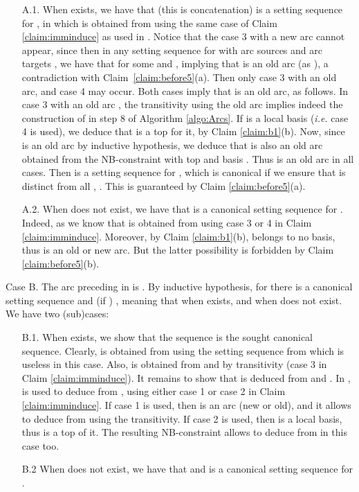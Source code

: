 \documentclass{article}
\begin{document}
\begin{enumerate} 
\item[A.1.]  When  exists, we have that  
(this is concatenation)
is a setting sequence for , in which   is obtained from  
using the
same case of Claim \ref{claim:imminduce} as used in . Notice that the case 3 with a new
arc  cannot appear, since then in any setting sequence  for 
 with arc sources  and arc targets , we have that 
 for some  and , implying that  is an
old arc (as ), a contradiction with Claim~\ref{claim:before5}(a). Then
only case 3 with an old arc, and case 4 may occur. Both cases imply that 
is an old arc, as follows. In case 3 with an old arc , the transitivity
using the old arc  implies indeed the construction of 
in step 8 of Algorithm \ref{algo:Arcs}. If  is a
local basis ({\em i.e.} case 4 is used), we deduce that  is a top for it, by
Claim \ref{claim:b1}(b). Now, since  is an old arc by inductive hypothesis,
we deduce that  is also an old arc obtained from the NB-constraint with top
 and basis  . Thus  is an old arc in all cases. Then
 is a setting sequence for ,
which is canonical if we ensure that  is distinct from all , .
This is guaranteed by Claim \ref{claim:before5}(a).
\item[A.2.] When  does not exist, we have that  is
a canonical setting sequence for . Indeed, as  we know that
 is obtained from  using case 3 or 4 in Claim 
\ref{claim:imminduce}. Moreover, by Claim \ref{claim:b1}(b),  belongs to no basis, 
thus  is an old or new arc. But the latter possibility is forbidden by 
Claim \ref{claim:before5}(b).
\end{enumerate}

Case B. The arc preceding  in  is . By inductive hypothesis, for
 there is a canonical setting sequence  and (if ) , meaning that  when 
exists, and  when  does not exist. We have two (sub)cases:

\begin{enumerate} 
\item[B.1.]  When  exists, we show that the sequence 
 is the sought canonical sequence.
Clearly,  is obtained from  using the setting sequence 
from which  is useless in this case. Also,  is obtained from
 and  by transitivity (case 3 in Claim \ref{claim:imminduce}).
It remains to show that  is deduced from  and .
In ,  is used to deduce  from ,
using either case 1 or case 2 in Claim \ref{claim:imminduce}. If case 1 is used, then
 is an arc (new or old), and it allows to deduce  from 
 using the transitivity. If case 2 is used, then 
is a local basis, thus  is a top of it. The resulting NB-constraint allows to deduce
 from   in this case too. 
\item[B.2] When  does not exist, we have that  and 
is a canonical setting sequence for .


 

\end{enumerate}
\end{document}
